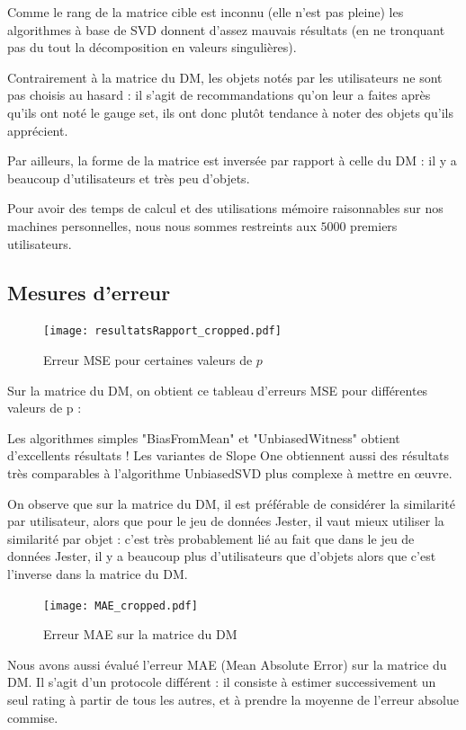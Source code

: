 \documentclass[11pt, openany, a4paper]{article}
\begin{document}
		Comme le rang de la matrice cible est inconnu (elle n'est pas pleine) les algorithmes à base de SVD donnent d'assez mauvais résultats (en ne tronquant pas du tout la décomposition en valeurs singulières).
		
		Contrairement à la matrice du DM, les objets notés par les utilisateurs ne sont pas choisis au hasard : il s'agit de recommandations qu'on leur a faites après qu'ils ont noté le gauge set, ils ont donc plutôt tendance à noter des objets qu'ils apprécient.
		
		Par ailleurs, la forme de la matrice est inversée par rapport à celle du DM : il y a beaucoup d'utilisateurs et très peu d'objets.
		
		Pour avoir des temps de calcul et des utilisations mémoire raisonnables sur nos machines personnelles, nous nous sommes restreints aux $5000$ premiers utilisateurs.
	
	\subsection{Mesures d'erreur}
	
		\begin{figure}[ht!]
			\centering
			\texttt{[image: resultatsRapport\_cropped.pdf]}
			\caption{Erreur MSE pour certaines valeurs de $p$}
		\end{figure}
		Sur la matrice du DM, on obtient ce tableau d'erreurs MSE pour différentes valeurs de p :
		
		
		Les algorithmes simples "BiasFromMean" et "UnbiasedWitness" obtient d'excellents résultats ! Les variantes de Slope One obtiennent aussi des résultats très comparables à l'algorithme UnbiasedSVD plus complexe à mettre en œuvre.
		
		On observe que sur la matrice du DM, il est préférable de considérer la similarité par utilisateur, alors que pour le jeu de données Jester, il vaut mieux utiliser la similarité par objet : c'est très probablement lié au fait que dans le jeu de données Jester, il y a beaucoup plus d'utilisateurs que d'objets alors que c'est l'inverse dans la matrice du DM.
		
		\begin{figure}[ht!]
			\centering
			\texttt{[image: MAE\_cropped.pdf]}
			\caption{Erreur MAE sur la matrice du DM}
		\end{figure}
		
		Nous avons aussi évalué l'erreur MAE (Mean Absolute Error) sur la matrice du DM. Il s'agit d'un protocole différent : il consiste à estimer successivement un seul rating à partir de tous les autres, et à prendre la moyenne de l'erreur absolue commise.
		
\end{document}
